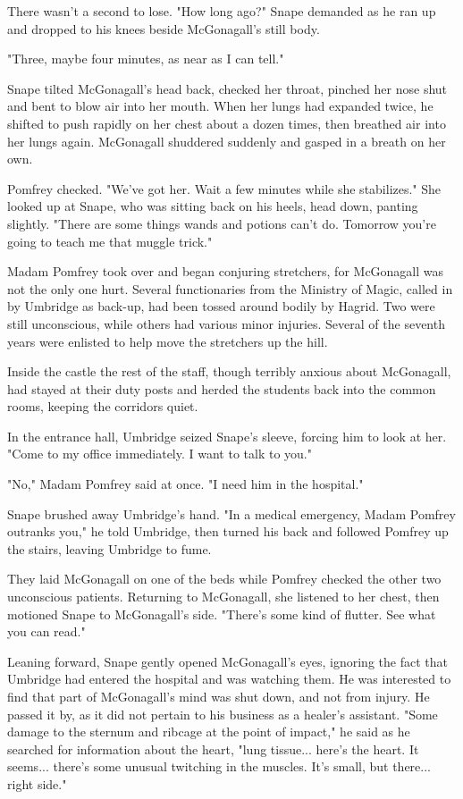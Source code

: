 There wasn't a second to lose. "How long ago?" Snape demanded as he ran up and dropped to his knees beside McGonagall's still body.

"Three, maybe four minutes, as near as I can tell."

Snape tilted McGonagall's head back, checked her throat, pinched her nose shut and bent to blow air into her mouth. When her lungs had expanded twice, he shifted to push rapidly on her chest about a dozen times, then breathed air into her lungs again. McGonagall shuddered suddenly and gasped in a breath on her own.

Pomfrey checked. "We've got her. Wait a few minutes while she stabilizes." She looked up at Snape, who was sitting back on his heels, head down, panting slightly. "There are some things wands and potions can't do. Tomorrow you're going to teach me that muggle trick."

Madam Pomfrey took over and began conjuring stretchers, for McGonagall was not the only one hurt. Several functionaries from the Ministry of Magic, called in by Umbridge as back-up, had been tossed around bodily by Hagrid. Two were still unconscious, while others had various minor injuries. Several of the seventh years were enlisted to help move the stretchers up the hill.

Inside the castle the rest of the staff, though terribly anxious about McGonagall, had stayed at their duty posts and herded the students back into the common rooms, keeping the corridors quiet.

In the entrance hall, Umbridge seized Snape's sleeve, forcing him to look at her. "Come to my office immediately. I want to talk to you."

"No," Madam Pomfrey said at once. "I need him in the hospital."

Snape brushed away Umbridge's hand. "In a medical emergency, Madam Pomfrey outranks you," he told Umbridge, then turned his back and followed Pomfrey up the stairs, leaving Umbridge to fume.

They laid McGonagall on one of the beds while Pomfrey checked the other two unconscious patients. Returning to McGonagall, she listened to her chest, then motioned Snape to McGonagall's side. "There's some kind of flutter. See what you can read."

Leaning forward, Snape gently opened McGonagall's eyes, ignoring the fact that Umbridge had entered the hospital and was watching them. He was interested to find that part of McGonagall's mind was shut down, and not from injury. He passed it by, as it did not pertain to his business as a healer's assistant. "Some damage to the sternum and ribcage at the point of impact," he said as he searched for information about the heart, "lung tissue... here's the heart. It seems... there's some unusual twitching in the muscles. It's small, but there... right side."

